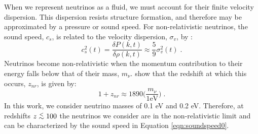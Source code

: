 \documentclass[twocolumn,superscriptaddress,prd]{revtex4}
\def\ltsima{$\; \buildrel < \over \sim \;$}
\def\lsim{\lower.5ex\hbox{\ltsima}}
\begin{document}
When we represent neutrinos as a fluid,
we must account for their finite velocity dispersion.  This dispersion
resists structure formation, and therefore may be
approximated by a pressure or sound speed.  
%
%
%
For non-relativistic neutrinos, the sound speed, $c_s$, is related to the
velocity dispersion, $\sigma_v$, by \citep{shoji10}:
\begin{equation}\label{eqn:soundspeed0}
  c_s^2(t) = \frac{ \delta P(k,t) }{ \delta \rho(k, t) }
  \approx \frac{5}{9} \sigma_v^2(t)\;.
\end{equation}
Neutrinos become non-relativistic when the momentum contribution to
their energy falls below that of their mass, $m_\nu$.
\cite{shoji10} show that the redshift
at which this occurs, $z_{nr}$, is given by:
\begin{equation}
  1 + z_{nr} \approx 1890 \bigg(\frac{m_\nu}{1 \text{eV}} \bigg) \;.
\end{equation}
In this work, we consider neutrino masses of 0.1 eV and 0.2 eV.
Therefore, at redshifts $z\lsim 100$ the neutrinos we consider are in
the non-relativistic limit and can be characterized by the sound speed 
in Equation \eqref{eqn:soundspeed0}.
\end{document}
